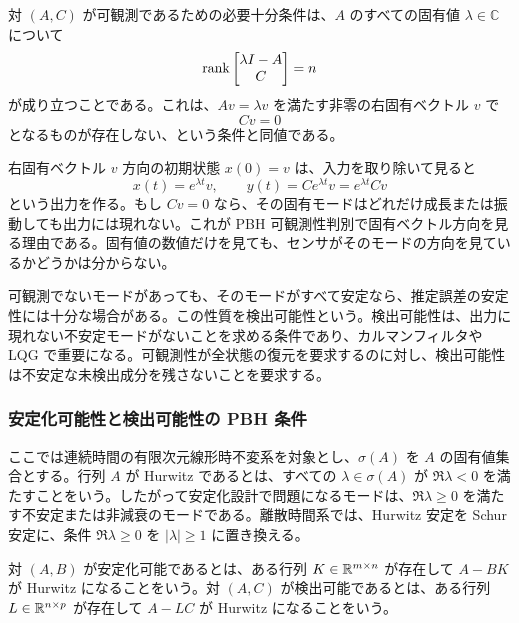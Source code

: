 \begin{theorem}
対 $(A,C)$ が可観測であるための必要十分条件は、$A$ のすべての固有値 $\lambda\in\mathbb{C}$ について
\begin{equation}
  \operatorname{rank}\begin{bmatrix}\lambda I-A\\ C\end{bmatrix}=n
  \label{eq:pbh-observability}
\end{equation}
が成り立つことである。これは、$Av=\lambda v$ を満たす非零の右固有ベクトル $v$ で
\begin{equation}
  Cv=0
\end{equation}
となるものが存在しない、という条件と同値である。
\end{theorem}

右固有ベクトル $v$ 方向の初期状態 $x(0)=v$ は、入力を取り除いて見ると
\begin{equation}
  x(t)=e^{\lambda t}v,\qquad
  y(t)=Ce^{\lambda t}v=e^{\lambda t}Cv
\end{equation}
という出力を作る。もし $Cv=0$ なら、その固有モードはどれだけ成長または振動しても出力には現れない。これが PBH 可観測性判別で固有ベクトル方向を見る理由である。固有値の数値だけを見ても、センサがそのモードの方向を見ているかどうかは分からない。

可観測でないモードがあっても、そのモードがすべて安定なら、推定誤差の安定性には十分な場合がある。この性質を検出可能性という。検出可能性は、出力に現れない不安定モードがないことを求める条件であり、カルマンフィルタや LQG で重要になる。可観測性が全状態の復元を要求するのに対し、検出可能性は不安定な未検出成分を残さないことを要求する。

\subsubsection{安定化可能性と検出可能性の PBH 条件}

ここでは連続時間の有限次元線形時不変系を対象とし、$\sigma(A)$ を $A$ の固有値集合とする。行列 $A$ が Hurwitz であるとは、すべての $\lambda\in\sigma(A)$ が $\Re\lambda<0$ を満たすことをいう。したがって安定化設計で問題になるモードは、$\Re\lambda\ge0$ を満たす不安定または非減衰のモードである。離散時間系では、Hurwitz 安定を Schur 安定に、条件 $\Re\lambda\ge0$ を $|\lambda|\ge1$ に置き換える。

\begin{definition}[安定化可能性と検出可能性]
対 $(A,B)$ が安定化可能であるとは、ある行列 $K\in\mathbb{R}^{m\times n}$ が存在して $A-BK$ が Hurwitz になることをいう。対 $(A,C)$ が検出可能であるとは、ある行列 $L\in\mathbb{R}^{n\times p}$ が存在して $A-LC$ が Hurwitz になることをいう。
\end{definition}

